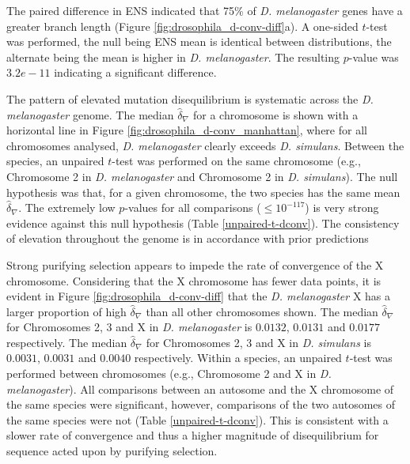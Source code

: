 The paired difference in ENS indicated that 75\% of \textit{D. melanogaster} genes have a greater branch length (Figure \ref{fig:drosophila_d-conv-diff}a).  A one-sided $t$-test was performed, the null being ENS mean is identical between distributions, the alternate being the mean is higher in \textit{D. melanogaster}. The resulting $p$-value was $3.2e-11$ indicating a significant difference. 



The pattern of elevated mutation disequilibrium is systematic across the \textit{D. melanogaster} genome. The median $\hat \delta_\nabla$ for a chromosome is shown with a horizontal line in Figure \ref{fig:drosophila_d-conv_manhattan}, where for all chromosomes analysed, \textit{D. melanogaster} clearly exceeds \textit{D. simulans}. Between the species, an unpaired $t$-test was performed on the same chromosome (e.g., Chromosome 2 in \textit{D. melanogaster} and Chromosome 2 in \textit{D. simulans}). The null hypothesis was that, for a given chromosome, the two species has the same mean $\hat\delta_\nabla$. The extremely low $p$-values for all comparisons ($\leq10^{-117}$) is very strong evidence against this null hypothesis (Table \ref{unpaired-t-dconv}). The consistency of elevation throughout the genome is in accordance with prior predictions

Strong purifying selection appears to impede the rate of convergence of the X chromosome. Considering that the X chromosome has fewer data points, it is evident in Figure \ref{fig:drosophila_d-conv-diff} that the \textit{D. melanogaster} X has a larger proportion of high $\hat \delta_\nabla$ than all other chromosomes shown. The median $\hat \delta_\nabla$ for Chromosomes 2, 3 and X in \textit{D. melanogaster} is $0.0132$, $0.0131$ and $0.0177$ respectively. The median $\hat \delta_\nabla$ for Chromosomes 2, 3 and X in \textit{D. simulans} is $0.0031$, $0.0031$ and $0.0040$ respectively. Within a species, an unpaired $t$-test was performed between chromosomes (e.g., Chromosome 2 and X in \textit{D. melanogaster}). All comparisons between an autosome and the X chromosome of the same species were significant, however, comparisons of the two autosomes of the same species were not (Table \ref{unpaired-t-dconv}). This is consistent with a slower rate of convergence and thus a higher magnitude of disequilibrium for sequence acted upon by purifying selection. 




